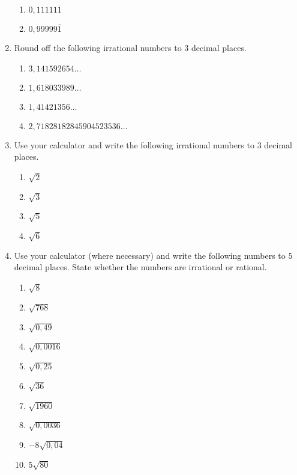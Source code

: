 \begin{eocexercises}{}
\begin{enumerate}[itemsep=5pt, label=\textbf{\arabic*}. ]
\begin{enumerate}[itemsep=5pt, label=\textbf{(\alph*)} ]
    \item $0,11111\overline{1}$
    \item $0,99999\overline{1}$
    \end{enumerate}
\item Round off the following irrational numbers to $3$ decimal places.
\begin{multicols}{2}
    \begin{enumerate}[itemsep=5pt, label=\textbf{(\alph*)} ] 
    \item $3,141592654\ldots$
    \item $1,618033989\ldots$
    \item $1,41421356\ldots$
    \item $2,71828182845904523536\ldots$
    \end{enumerate}
\end{multicols}
\item Use your calculator and write the following irrational numbers to $3$ decimal places.
\begin{multicols}{2}
    \begin{enumerate}[itemsep=5pt, label=\textbf{(\alph*)} ] 
    \item $\sqrt{2}$
    \item $\sqrt{3}$
    \item $\sqrt{5}$
    \item $\sqrt{6}$
    \end{enumerate}
\end{multicols}
\item Use your calculator (where necessary) and write the following numbers to $5$ decimal places. State whether the numbers are irrational or rational.
\begin{multicols}{2}
    \begin{enumerate}[itemsep=5pt, label=\textbf{(\alph*)} ] 
    \item $\sqrt{8}$
    \item $\sqrt{768}$
    \item $\sqrt{0,49}$
    \item $\sqrt{0,0016}$
    \item $\sqrt{0,25}$
    \item $\sqrt{36}$
    \item $\sqrt{1960}$
    \item $\sqrt{0,0036}$
    \item $-8\sqrt{0,04}$
    \item $5\sqrt{80}$
    \end{enumerate}
\end{multicols}

\end{enumerate}
\end{eocexercises}
